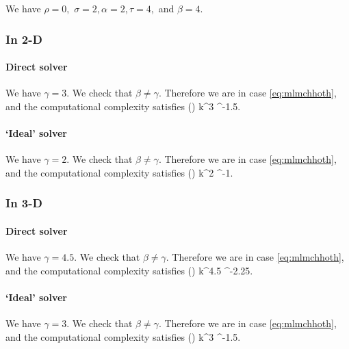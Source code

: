 We have $\rho=0,$ $\sigma = 2, \alpha = 2, \tau = 4,$ and $\beta = 4$.

\subsubsection{In 2-D}

\paragraph{Direct solver}

We have $\gamma = 3$. We check that  $\beta \neq \gamma.$ Therefore we are in case \eqref{eq:mlmchhoth}, and the computational complexity satisfies
\beqs
\CMLhL(\eps) \lesssim k^3 \eps^{-1.5}.
\eeqs

\paragraph{`Ideal' solver}

We have $\gamma = 2$. We check that  $\beta \neq \gamma.$ Therefore we are in case \eqref{eq:mlmchhoth}, and the computational complexity satisfies
\beqs
\CMLhL(\eps) \lesssim k^2 \eps^{-1}.
\eeqs

\subsubsection{In 3-D}

\paragraph{Direct solver}

We have $\gamma = 4.5$. We check that  $\beta \neq \gamma.$ Therefore we are in case \eqref{eq:mlmchhoth}, and the computational complexity satisfies
\beqs
\CMLhL(\eps) \lesssim k^{4.5} \eps^{-2.25}.
\eeqs

\paragraph{`Ideal' solver}

We have $\gamma = 3$. We check that  $\beta \neq \gamma.$ Therefore we are in case \eqref{eq:mlmchhoth}, and the computational complexity satisfies
\beqs
\CMLhL(\eps) \lesssim k^3 \eps^{-1.5}.
\eeqs
